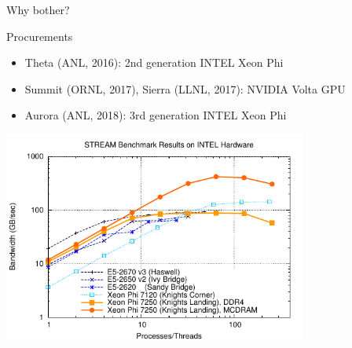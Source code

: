 \begin{frame}{Why bother?}
  \begin{block}{Procurements}
  \begin{itemize}
   \item Theta (ANL, 2016): 2nd generation INTEL Xeon Phi
   \item Summit (ORNL, 2017), Sierra (LLNL, 2017): NVIDIA Volta GPU
   \item Aurora (ANL, 2018): 3rd generation INTEL Xeon Phi
  \end{itemize}
  \end{block}
  
  \begin{center} \vspace*{-0.5cm}
   \includegraphics[width=0.75\textwidth]{figures/stream.pdf}
  \end{center}

\end{frame}


